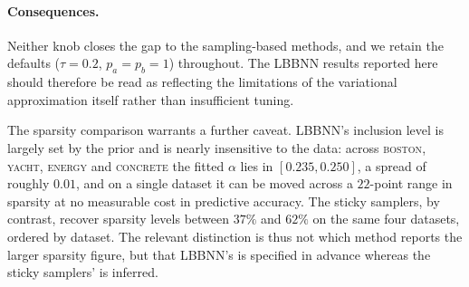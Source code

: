 \paragraph{Consequences.}
Neither knob closes the gap to the sampling-based methods, and we retain
the defaults ($\tau = 0.2$, $p_a = p_b = 1$) throughout. The LBBNN
results reported here should therefore be read as reflecting the
limitations of the variational approximation itself rather than
insufficient tuning.

The sparsity comparison warrants a further caveat. LBBNN's inclusion
level is largely set by the prior and is nearly insensitive to the data:
across \textsc{boston}, \textsc{yacht}, \textsc{energy} and
\textsc{concrete} the fitted $\alpha$ lies in $[0.235, 0.250]$, a spread
of roughly $0.01$, and on a single dataset it can be moved across a
$22$-point range in sparsity at no measurable cost in predictive
accuracy. The sticky samplers, by contrast, recover sparsity levels
between $37\%$ and $62\%$ on the same four datasets, ordered by dataset.
The relevant distinction is thus not which method reports the larger
sparsity figure, but that LBBNN's is specified in advance whereas the
sticky samplers' is inferred.
